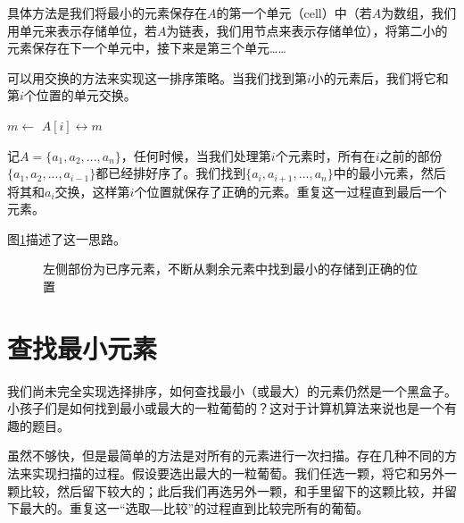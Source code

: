 \documentclass{ctexart}
\begin{document}
具体方法是我们将最小的元素保存在$A$的第一个单元（cell）中（若$A$为数组，我们用单元来表示存储单位，若$A$为链表，我们用节点来表示存储单位），将第二小的元素保存在下一个单元中，接下来是第三个单元……

可以用交换的方法来实现这一排序策略。当我们找到第$i$小的元素后，我们将它和第$i$个位置的单元交换。

\begin{algorithmic}[1]
    \State $m \gets$ 
    \State {} $A[i] \leftrightarrow m$
  \EndFor
\EndFunction
\end{algorithmic}

记$A = \{a_1, a_2, ..., a_n\}$，任何时候，当我们处理第$i$个元素时，所有在$i$之前的部份$\{a_1, a_2, ..., a_{i-1}\}$都已经排好序了。我们找到$\{a_i, a_{i+1}, ..., a_n\}$中的最小元素，然后将其和$a_i$交换，这样第$i$个位置就保存了正确的元素。重复这一过程直到最后一个元素。

图\ref{fig:in-place-ssort}描述了这一思路。

\begin{figure}[htbp]
  \centering
  \caption{左侧部份为已序元素，不断从剩余元素中找到最小的存储到正确的位置}
  \label{fig:in-place-ssort}
\end{figure}

\section{查找最小元素}

我们尚未完全实现选择排序，如何查找最小（或最大）的元素仍然是一个黑盒子。小孩子们是如何找到最小或最大的一粒葡萄的？这对于计算机算法来说也是一个有趣的题目。

虽然不够快，但是最简单的方法是对所有的元素进行一次扫描。存在几种不同的方法来实现扫描的过程。假设要选出最大的一粒葡萄。我们任选一颗，将它和另外一颗比较，然后留下较大的；此后我们再选另外一颗，和手里留下的这颗比较，并留下最大的。重复这一“选取―比较”的过程直到比较完所有的葡萄。
\end{document}

